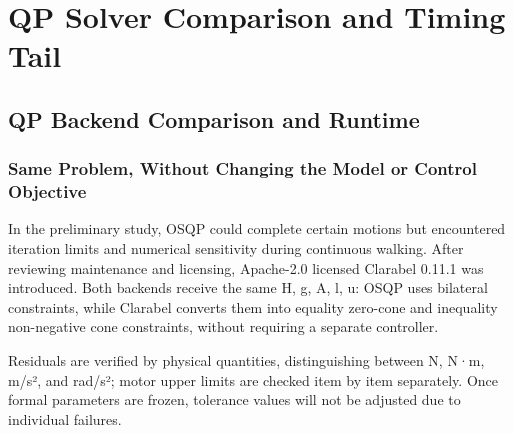 

\FloatBarrier

\section{QP Solver Comparison and Timing Tail}

\label{stage:s27}

\subsection{QP Backend Comparison and Runtime}\label{s27-detail-1}

\subsubsection{Same Problem, Without Changing the Model or Control Objective}\label{s27-detail-2}

In the preliminary study, OSQP could complete certain motions but encountered iteration limits and numerical sensitivity during continuous walking. After reviewing maintenance and licensing, Apache-2.0 licensed Clarabel 0.11.1 was introduced. Both backends receive the same H, g, A, l, u: OSQP uses bilateral constraints, while Clarabel converts them into equality zero-cone and inequality non-negative cone constraints, without requiring a separate controller.

Residuals are verified by physical quantities, distinguishing between N, N·m, m/s², and rad/s²; motor upper limits are checked item by item separately. Once formal parameters are frozen, tolerance values will not be adjusted due to individual failures.

